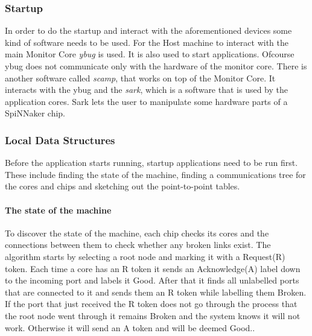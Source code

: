 \documentclass[12pt,a4paper]{article}
\begin{document}
\subsubsection{Startup}
In order to do the startup and interact with the aforementioned devices some kind of software needs to be used. For the Host machine to interact with the main Monitor Core \emph{ybug} is used. It is also used to start applications. Ofcourse ybug does not communicate only with the hardware of the monitor core. There is another software called \emph{scamp}, that works on top of the Monitor Core. It interacts with the ybug and the \emph{sark}, which is a software that is used by the application cores. Sark lets the user to manipulate some hardware parts of a SpiNNaker chip.\cite{spinnweb}
\subsubsection{Local Data Structures}
Before the application starts running, startup applications need to be run first. These include finding the state of the machine, finding a communications tree for the cores and chips and sketching out the point-to-point tables.

\paragraph{The state of the machine}
To discover the state of the machine, each chip checks its cores and the connections between them to check whether any broken links exist. The algorithm starts by selecting a root node and marking it with a Request(R) token. Each time a core has an R token it sends an Acknowledge(A) label down to the incoming port and labels it Good. After that it finds all unlabelled ports that are connected to it and sends them an R token while labelling them Broken. If the port that just received the R token does not go through the process that the root node went through it remains Broken and the system knows it will not work. Otherwise it will send an A token and will be deemed Good.\cite{jefflec}.
\end{document}
